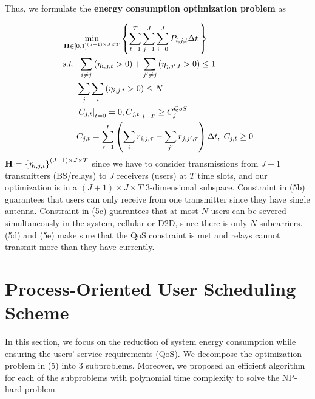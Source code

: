 \documentclass{ieeeaccess}
\begin{document}
Thus, we formulate the \textbf{energy consumption optimization problem} as

\begin{subequations}
\begin{align}
& \mathop {\min }\limits_{{\mathbf{{\rm H}}} \in {{\left[ {0,1} \right]}^{\left( {J + 1} \right) \times J \times T}}} \left\{ {\sum\limits_{t = 1}^T {\sum\limits_{j = 1}^J {\sum\limits_{i = 0}^J {{P_{i,j,t}}\Delta t} \,} } } \right\} \\
& {s.t.} \;\; \sum\limits_{i \ne j} {\left( {{\eta _{i,j,t}} > 0} \right)}  + \sum\limits_{j' \ne j} {\left( {{\eta _{j,j',t}} > 0} \right) \le {\text{1}}} \\
& \;\;\;\;\;\; \sum\limits_j {\sum\limits_i {\left( {{\eta _{i,j,t}} > 0} \right)} }  \le N \\
& \;\;\;\;\;\; {\left. {{{\left. {{C_{j,t}}} \right|}_{t = 0}} = 0, {C_{j,t}}} \right|_{t = T}} \ge C_j^{QoS} \\
& \;\;\;\;\;\; {C_{j,t}} = \sum\limits_{\tau  = 1}^t {\left( {\sum\limits_i {{r_{i,j,\tau }}}  - \sum\limits_{j'} {{r_{j,j',\tau }}} } \right)\Delta t} ,\; {C_{j,t}} \ge 0
\end{align}
\end{subequations}
${\mathbf{{\rm H}}}{\text{ = }}{\left\{ {{\eta _{i,j,t}}} \right\}^{\left( {J + 1} \right) \times J \times T}}$ since we have to consider transmissions from ${J + 1}$ transmitters (BS/relays) to $J$ receivers (users) at $T$ time slots, and our optimization is in a $\left( {J + 1} \right) \times J \times T$ 3-dimensional subspace. Constraint in (5b) guarantees that users can only receive from one transmitter since they have single antenna. Constraint in (5c) guarantees that at most $N$ users can be severed simultaneously in the system, cellular or D2D, since there is only $N$ subcarriers. (5d) and (5e) make sure that the QoS constraint is met and relays cannot transmit more than they have currently.


\section{Process-Oriented User Scheduling Scheme}
In this section, we focus on the reduction of system energy consumption while ensuring the users' service requirements (QoS). We decompose the optimization problem in (5) into 3 subproblems. Moreover, we proposed an efficient algorithm for each of the subproblems with polynomial time complexity to solve the NP-hard problem.
\end{document}
